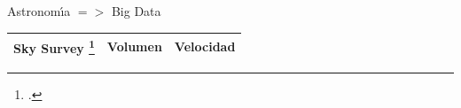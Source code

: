 \documentclass[11pt]{beamer}
\begin{document}
\begin{frame}[fragile]{Astronom\'{\i}a $=>$ Big Data}
\small
\begin{table}[]
\begin{tabular}{ccc}
Sky Survey \footcite{garofalo2016astrophysics}  & Volumen & Velocidad       \\ \hline
\end{tabular}
\end{table}
\normalsize
\end{frame}
\end{document}
